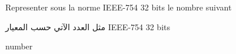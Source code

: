 Representer sous la norme IEEE-754 32 bits le nombre suivant

\begin{arab}[utf]
مثل العدد الآتي حسب المعيار IEEE-754 32 bits
\end{arab}


{{  number }}